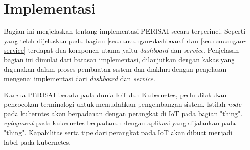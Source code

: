 \section{Implementasi}

Bagian ini menjelaskan tentang implementasi PERISAI secara terperinci. Seperti yang telah dijelaskan pada bagian \ref{sec:rancangan-dashboard} dan \ref{sec:rancangan-service} terdapat dua komponen utama yaitu \textit{dashboard} dan \textit{service}. Penjelasan bagian ini dimulai dari batasan implementasi, dilanjutkan dengan kakas yang digunakan dalam proses pembuatan sistem dan diakhiri dengan penjelasan mengenai implementasi dari \textit{dashboard} dan \textit{service}.

Karena PERISAI berada pada dunia IoT dan Kubernetes, perlu dilakukan pencocokan terminologi untuk memudahkan pengembangan sistem. Istilah \textit{node} pada kuberntes akan berpadanan dengan perangkat di IoT pada bagian "thing". \textit{eployment} pada kubernetes berpadanan dengan aplikasi yang dijalankan pada "thing". Kapabilitas serta tipe dari perangkat pada IoT akan dibuat menjadi label pada kubernetes.









